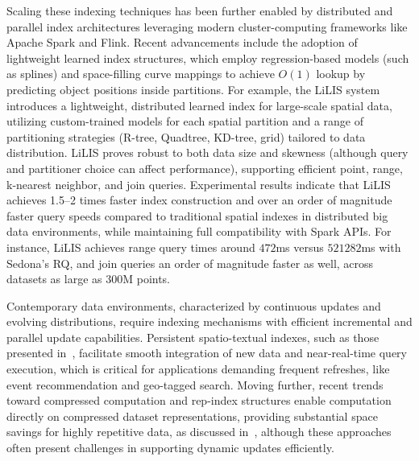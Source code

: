 \documentclass[sigconf]{acmart}
\begin{document}
Scaling these indexing techniques has been further enabled by distributed and parallel index architectures leveraging modern cluster-computing frameworks like Apache Spark and Flink. Recent advancements include the adoption of lightweight learned index structures, which employ regression-based models (such as splines) and space-filling curve mappings to achieve $O(1)$ lookup by predicting object positions inside partitions. For example, the LiLIS system~\cite{ref111} introduces a lightweight, distributed learned index for large-scale spatial data, utilizing custom-trained models for each spatial partition and a range of partitioning strategies (R-tree, Quadtree, KD-tree, grid) tailored to data distribution. LiLIS proves robust to both data size and skewness (although query and partitioner choice can affect performance), supporting efficient point, range, k-nearest neighbor, and join queries. Experimental results indicate that LiLIS achieves 1.5–2 times faster index construction and over an order of magnitude faster query speeds compared to traditional spatial indexes in distributed big data environments, while maintaining full compatibility with Spark APIs. For instance, LiLIS achieves range query times around $472$ms versus $521282$ms with Sedona's RQ, and join queries an order of magnitude faster as well, across datasets as large as 300M points.

Contemporary data environments, characterized by continuous updates and evolving distributions, require indexing mechanisms with efficient incremental and parallel update capabilities. Persistent spatio-textual indexes, such as those presented in~\cite{ref114,ref118}, facilitate smooth integration of new data and near-real-time query execution, which is critical for applications demanding frequent refreshes, like event recommendation and geo-tagged search. Moving further, recent trends toward compressed computation and rep-index structures enable computation directly on compressed dataset representations, providing substantial space savings for highly repetitive data, as discussed in~\cite{ref118}, although these approaches often present challenges in supporting dynamic updates efficiently.
\end{document}
